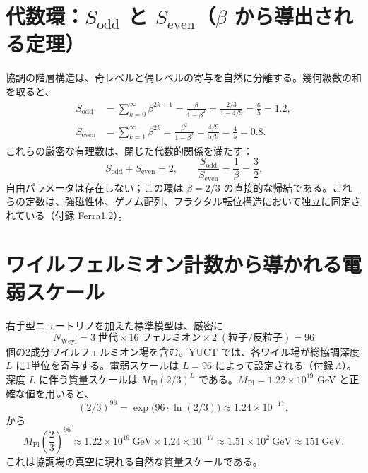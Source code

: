 \documentclass[12pt,a4paper]{article}
\begin{document}
	\section{代数環：\(S_{\mathrm{odd}}\) と \(S_{\mathrm{even}}\)（\(\beta\) から導出される定理）}
	\label{sec:algebraic-loop}
	
	協調の階層構造は、奇レベルと偶レベルの寄与を自然に分離する。幾何級数の和を取ると、
	\begin{align}
		S_{\mathrm{odd}} &= \sum_{k=0}^{\infty} \beta^{2k+1} = \frac{\beta}{1-\beta^{2}} = \frac{2/3}{1 - 4/9} = \frac{6}{5} = 1.2, \label{eq:sodd}\\
		S_{\mathrm{even}} &= \sum_{k=1}^{\infty} \beta^{2k} = \frac{\beta^{2}}{1-\beta^{2}} = \frac{4/9}{5/9} = \frac{4}{5} = 0.8. \label{eq:seven}
	\end{align}
	これらの厳密な有理数は、閉じた代数的関係を満たす：
	\begin{equation}
		\boxed{S_{\mathrm{odd}} + S_{\mathrm{even}} = 2, \qquad \frac{S_{\mathrm{odd}}}{S_{\mathrm{even}}} = \frac{1}{\beta} = \frac{3}{2}}.
		\label{eq:algebraic-loop}
	\end{equation}
	自由パラメータは存在しない；この環は \(\beta = 2/3\) の直接的な帰結である。これらの定数は、強磁性体、ゲノム配列、フラクタル転位構造において独立に同定されている（付録 Ferra1.2）。
	
	\section{ワイルフェルミオン計数から導かれる電弱スケール}
	
	右手型ニュートリノを加えた標準模型は、厳密に
	\begin{equation}
		N_{\mathrm{Weyl}} = 3\;\text{世代} \times 16\;\text{フェルミオン} \times 2\;(\text{粒子/反粒子}) = 96
	\end{equation}
	個の2成分ワイルフェルミオン場を含む。YUCT では、各ワイル場が総協調深度 \(L\) に1単位を寄与する。電弱スケールは \(L = 96\) によって設定される（付録 \(\Lambda\)）。深度 \(L\) に伴う質量スケールは \(M_{\mathrm{Pl}} (2/3)^{L}\) である。\(M_{\mathrm{Pl}} = 1.22 \times 10^{19}\) GeV と正確な値を用いると、
	\begin{equation}
		(2/3)^{96} = \exp\bigl(96 \cdot \ln(2/3)\bigr) \approx 1.24 \times 10^{-17},
	\end{equation}
	から
	\begin{equation}
		M_{\mathrm{Pl}} \left(\frac{2}{3}\right)^{96} \approx 1.22 \times 10^{19}\ \mathrm{GeV} \times 1.24 \times 10^{-17} \approx 1.51 \times 10^{2}\ \mathrm{GeV} \approx 151\ \mathrm{GeV}.
	\end{equation}
	これは協調場の真空に現れる自然な質量スケールである。
	
\end{document}

